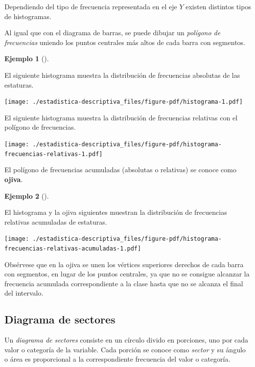 \documentclass[
  a4paper,
]{scrreport}
\theoremstyle{definition}
\theoremstyle{definition}
\newtheorem{example}{Ejemplo}[chapter]
\theoremstyle{plain}
\theoremstyle{remark}
\begin{document}
Dependiendo del tipo de frecuencia representada en el eje \(Y\) existen
distintos tipos de histogramas.

Al igual que con el diagrama de barras, se puede dibujar un
\emph{polígono de frecuencias} uniendo los puntos centrales más altos de
cada barra con segmentos.

\leavevmode{}%
\begin{example}[]\label{exm-histograma}

El siguiente histograma muestra la distribución de frecuencias absolutas
de las estaturas.

\texttt{[image: ./estadistica-descriptiva\_files/figure-pdf/histograma-1.pdf]}

El siguiente histograma muestra la distribución de frecuencias relativas
con el polígono de frecuencias.

\texttt{[image: ./estadistica-descriptiva\_files/figure-pdf/histograma-frecuencias-relativas-1.pdf]}

\end{example}

El polígono de frecuencias acumuladas (absolutas o relativas) se conoce
como \textbf{ojiva}.

\leavevmode{}%
\begin{example}[]\label{exm-ojiva}

El histograma y la ojiva siguientes muestran la distribución de
frecuencias relativas acumuladas de estaturas.

\texttt{[image: ./estadistica-descriptiva\_files/figure-pdf/histograma-frecuencias-relativas-acumuladas-1.pdf]}

\end{example}

Obsérvese que en la ojiva se unen los vértices superiores derechos de
cada barra con segmentos, en lugar de los puntos centrales, ya que no se
consigue alcanzar la frecuencia acumulada correspondiente a la clase
hasta que no se alcanza el final del intervalo.

\hypertarget{diagrama-de-sectores}{%
\subsection{Diagrama de sectores}\label{diagrama-de-sectores}}

Un \emph{diagrama de sectores} consiste en un círculo divido en
porciones, uno por cada valor o categoría de la variable. Cada porción
se conoce como \emph{sector} y su ángulo o área es proporcional a la
correspondiente frecuencia del valor o categoría.
\end{document}

